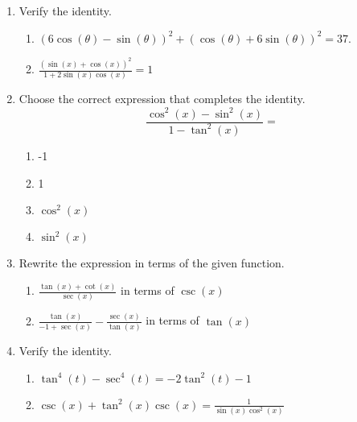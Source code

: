 \begin{enumerate}
\item Verify the identity.

\begin{enumerate}
\item $\left(6\cos(\theta)-\sin(\theta)\right)^2+\left(\cos(\theta)+6\sin(\theta)\right)^2=37$.
\vfill
\item $\displaystyle \frac{(\sin(x)+\cos(x))^2}{1+2\sin(x)\cos(x)}=1$
\vfill
\end{enumerate}

\clearpage

\item Choose the correct expression that completes the identity.
$$\frac{\cos^2(x)-\sin^2(x)}{1-\tan^2(x)}=$$
\begin{enumerate}
\item -1
\item 1
\item $\cos^2(x)$
\item $\sin^2(x)$
\end{enumerate}


\item Rewrite the expression in terms of the given function.
\begin{enumerate}
\item $\displaystyle \frac{\tan(x)+\cot(x)}{\sec(x)}$ in terms of $\csc(x)$
\vfill
\item $\displaystyle \frac{\tan(x)}{-1+\sec(x)}-\frac{\sec(x)}{\tan(x)}$ in terms of $\tan(x)$
\vfill

\end{enumerate}

\clearpage
\item Verify the identity.

\begin{enumerate}
\item $\tan^4(t)-\sec^4(t)=-2\tan^2(t)-1$
\vfill
\item $\displaystyle \csc(x)+\tan^2(x)\csc(x)=\frac{1}{\sin(x)\cos^2(x)}$
\vfill
\end{enumerate}


\end{enumerate}



